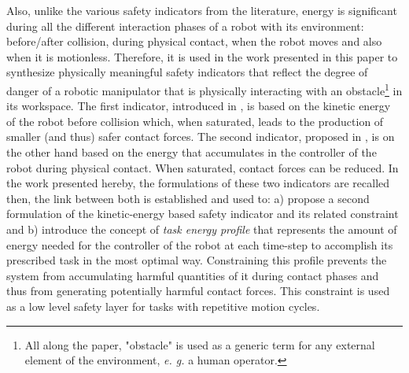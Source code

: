 \documentclass[letterpaper, 10 pt, conference]{ieeeconf}      %
\begin{document}
Also, unlike the various safety indicators from the literature, energy is significant during all the different interaction phases of a robot with its environment: before/after collision, during physical contact, when the robot moves and also when it is motionless. Therefore, it is used in the work presented in this paper to synthesize physically meaningful safety indicators that reflect the degree of danger of a robotic manipulator that is physically interacting with an obstacle\footnote{All along the paper, "obstacle" is used as a generic term for any external element of the environment, \textit{e. g.} a human operator.} in its workspace. The first indicator, introduced in \cite{meguenani2015control}, is based on the kinetic energy of the robot before collision which, when saturated, leads to the production of smaller (and thus) safer contact forces. The second indicator, proposed in \cite{meguenani2016energy}, is on the other hand based on the energy that accumulates in the controller of the robot during physical contact. When saturated, contact forces can be reduced. In the work presented hereby, the formulations of these two indicators are recalled then, the link between both is established and used to: a) propose a second formulation of the kinetic-energy based safety indicator and its related constraint and b) introduce the concept of \textit{task energy profile} that represents the amount of energy needed for the controller of the robot at each time-step to accomplish its prescribed task in the most optimal way. Constraining this profile prevents the system from accumulating harmful quantities of it during contact phases and thus from generating potentially harmful contact forces. This constraint is used as a low level safety layer for tasks with repetitive motion cycles.
\end{document}
